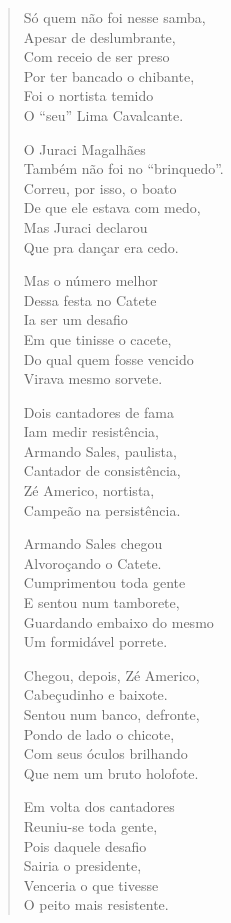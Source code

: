 \begin{verse}
Só quem não foi nesse samba,\\
Apesar de deslumbrante,\\
Com receio de ser preso\\
Por ter bancado o chibante,\\
Foi o nortista temido\\
O “seu” Lima Cavalcante.

O Juraci Magalhães\\
Também não foi no “brinquedo”.\\
Correu, por isso, o boato\\
De que ele estava com medo,\\
Mas Juraci declarou\\
Que pra dançar era cedo.

Mas o número melhor\\
Dessa festa no Catete\\
Ia ser um desafio\\
Em que tinisse o cacete,\\
Do qual quem fosse vencido\\
Virava mesmo sorvete.

Dois cantadores de fama\\
Iam medir resistência,\\
Armando Sales, paulista,\\
Cantador de consistência,\\
Zé Americo, nortista,\\
Campeão na persistência.
\pagebreak

Armando Sales chegou\\
Alvoroçando o Catete.\\
Cumprimentou toda gente\\
E sentou num tamborete,\\
Guardando embaixo do mesmo\\
Um formidável porrete.

Chegou, depois, Zé Americo,\\
Cabeçudinho e baixote.\\
Sentou num banco, defronte,\\
Pondo de lado o chicote,\\
Com seus óculos brilhando\\
Que nem um bruto holofote.

Em volta dos cantadores\\
Reuniu-se toda gente,\\
Pois daquele desafio\\
Sairia o presidente,\\
Venceria o que tivesse\\
O peito mais resistente. 


\end{verse}
